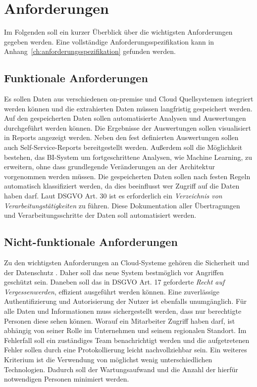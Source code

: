 \section{Anforderungen}
\label{sec:anforderungen}
Im Folgenden soll ein kurzer Überblick über die wichtigsten Anforderungen gegeben werden. Eine vollständige Anforderungsspezifikation kann in Anhang~\ref{ch:anforderungsspezifikation} gefunden werden. 

\subsection{Funktionale Anforderungen}
Es sollen Daten aus verschiedenen on-premise und Cloud Quellsystemen integriert werden können und die extrahierten Daten müssen langfristig gespeichert werden. Auf den gespeicherten Daten sollen automatisierte Analysen und Auswertungen durchgeführt werden können. Die Ergebnisse der Auswertungen sollen visualisiert in Reports angezeigt werden. Neben den fest definierten Auswertungen sollen auch Self-Service-Reports bereitgestellt werden. Außerdem soll die Möglichkeit bestehen, das BI-System um fortgeschrittene Analysen, wie Machine Learning, zu erweitern, ohne dass grundlegende Veränderungen an der Architektur vorgenommen werden müssen. Die gespeicherten Daten sollen nach festen Regeln automatisch klassifiziert werden, da dies beeinflusst wer Zugriff auf die Daten haben darf. Laut DSGVO Art. 30 ist es erforderlich ein \textit{Verzeichnis von Verarbeitungstätigkeiten} zu führen. Diese Dokumentation aller Übertragungen und Verarbeitungsschritte der Daten soll automatisiert werden. 

\subsection{Nicht-funktionale Anforderungen}
Zu den wichtigsten Anforderungen an Cloud-Systeme gehören die Sicherheit und der Datenschutz \cite{gurjar_cloud_2013}. Daher soll das neue System bestmöglich vor Angriffen geschützt sein. Daneben soll das in DSGVO Art. 17 geforderte \textit{Recht auf Vergessenwerden}, effizient ausgeführt werden können. Eine zuverlässige Authentifizierung und Autorisierung der Nutzer ist ebenfalls unumgänglich. Für alle Daten und Informationen muss sichergestellt werden, dass nur berechtigte Personen diese sehen können. Worauf ein Mitarbeiter Zugriff haben darf, ist abhängig von seiner Rolle im Unternehmen und seinem regionalen Standort. Im Fehlerfall soll ein zuständiges Team benachrichtigt werden und die aufgetretenen Fehler sollen durch eine Protokollierung leicht nachvollziehbar sein. Ein weiteres Kriterium ist die Verwendung von möglichst wenig unterschiedlichen Technologien. Dadurch soll der Wartungsaufwand und die Anzahl der hierfür notwendigen Personen minimiert werden.